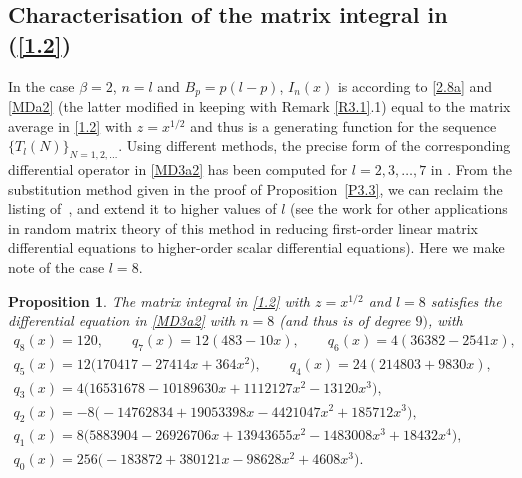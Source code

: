 \documentclass[pdftex]{sigma}
\numberwithin{equation}{section}
\newtheorem{Proposition}[Theorem]{Proposition}
\theoremstyle{definition}
\begin{document}
\subsection[Characterisation of the matrix integral in (1.3)]{Characterisation of the matrix integral in (\ref{1.2})}\label{S4.2}
 In the case $\beta = 2$, $n=l$ and $B_p = p(l-p)$, $I_{n}(x)$ is according to \eqref{2.8a} and \eqref{MDa2}
 (the latter modified in keeping with Remark \ref{R3.1}.1)
 equal to the matrix average in
 \eqref{1.2} with $z = x^{1/2}$ and thus is a generating function for the sequence $\{ T_l(N) \}_{N=1,2,\dots}$.
 Using different methods, the precise form of the corresponding differential operator in \eqref{MD3a2} has been computed for $l=2,3,\dots,7$ in \cite{BG00}. From the substitution method given in the proof of Proposition~\ref{P3.3}, we can reclaim the listing of~\cite{BG00}, and extend it to higher values of $l$ (see the work \cite{RF21} for other applications in random matrix theory of this method in reducing first-order linear matrix differential equations to higher-order scalar differential equations). Here we make note of the case $l=8$.

 \begin{Proposition}\label{P3.4}
The matrix integral in \eqref{1.2} with $z = x^{1/2}$ and $l=8$ satisfies the differential equation in \eqref{MD3a2} with $n=8$ {\rm(}and thus is of degree $9)$, with
 \begin{gather*}
 q_8(x) = 120,\qquad q_7(x) = 12 (483-10 x),\qquad
 q_6(x) = 4 (36382 - 2541 x) , \\
 q_5(x) = 12 \bigl(170417 - 27414 x + 364 x^2\bigr),\qquad
 q_4(x) = 24 (214803 + 9830 x), \\
 q_3(x) = 4 \bigl(16531678 - 10189630 x + 1112127 x^2 - 13120 x^3\bigr), \\
 q_2(x) = -8 \bigl(-14762834 + 19053398 x - 4421047 x^2 + 185712 x^3\bigr), \\
 q_1(x) = 8 \bigl(5883904 - 26926706 x + 13943655 x^2 - 1483008 x^3 + 18432 x^4\bigr), \\
 q_0(x) =256 \bigl(-183872 + 380121 x - 98628 x^2 + 4608 x^3\bigr).
 \end{gather*}
 \end{Proposition}
\end{document}
